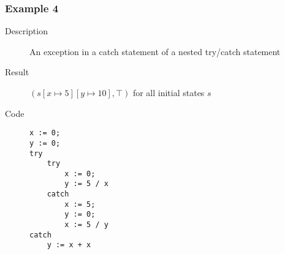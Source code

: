 \documentclass[11pt,oneside,a4paper]{article}
\begin{document}
\subsubsection*{Example 4}
\begin{description}
\item[Description] An exception in a catch statement of a nested try/catch
statement
\item[Result] \((s[x \mapsto 5][y \mapsto 10], \top)\) for all initial states
\(s\)
\item[Code] \hfill
\begin{verbatim}
x := 0;
y := 0;
try
    try
        x := 0;
        y := 5 / x
    catch
        x := 5;
        y := 0;
        x := 5 / y
catch
    y := x + x
\end{verbatim}
\end{description}
\end{document}
